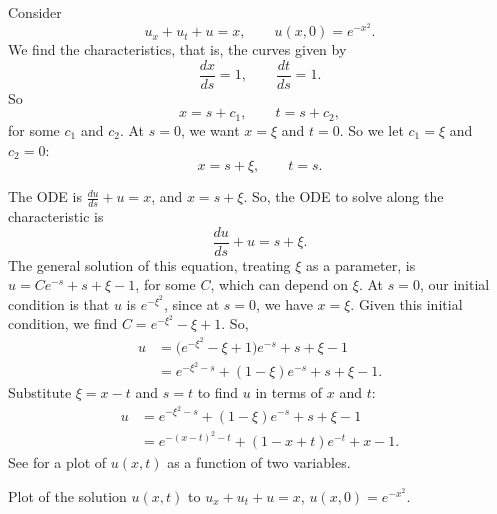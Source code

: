 \begin{example}
Consider
\begin{equation*}
u_x + u_t + u = x, \qquad u(x,0) = e^{-x^2} .
\end{equation*}
We find the characteristics, that is, the curves given by
\begin{equation*}
\frac{dx}{ds} = 1, \qquad \frac{dt}{ds} = 1 .
\end{equation*}
So
\begin{equation*}
x = s + c_1, \qquad t = s+ c_2 ,
\end{equation*}
for some $c_1$ and $c_2$.
At $s=0$, we want $x=\xi$ and $t=0$.  So
we let $c_1 = \xi$ and $c_2 = 0$:
\begin{equation*}
x = s + \xi, \qquad t = s .
\end{equation*}

The ODE is $\frac{du}{ds} + u = x$, and $x = s+\xi$. So, the ODE
to solve along the characteristic is
\begin{equation*}
\frac{du}{ds} + u = s+ \xi .
\end{equation*}
The general solution of this equation, treating $\xi$ as a parameter, is 
$u = C e^{-s}+s+\xi-1$, for some $C$, which can depend on $\xi$.
At $s=0$, our initial condition is that $u$ is
$e^{-\xi^2}$, since at $s=0$, we have $x=\xi$.
Given this initial condition, we find $C=e^{-\xi^2} - \xi +1$.  So,
\begin{equation*}
\begin{split}
u & =
\bigl(e^{-\xi^2} - \xi +1\bigr) e^{-s}+s+\xi-1
\\
& =
e^{-\xi^2-s} + (1 - \xi) e^{-s} +s+\xi-1 .
\end{split}
\end{equation*}
Substitute $\xi = x-t$ and $s=t$ to find $u$ in terms of $x$ and $t$:
\begin{equation*}
\begin{split}
u
& =
e^{-\xi^2-s} + (1 - \xi) e^{-s} +s+\xi-1 
\\
& =
e^{-{(x-t)}^2-t} + (1 - x + t) e^{-t} +x-1 .
\end{split}
\end{equation*}
See  for a plot of $u(x,t)$ as a function of
two variables.
\begin{myfig}
\capstart
{}
\caption{Plot of the solution $u(x,t)$ to
$u_x + u_t + u = x$,  $u(x,0) = e^{-x^2}$.\label{fopde:surfaceplot}}
\end{myfig}
\end{example}

